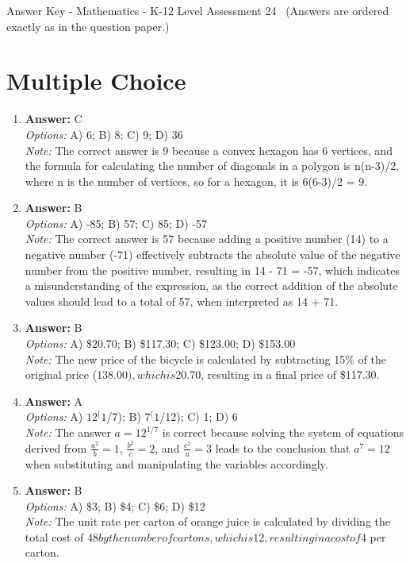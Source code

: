 \documentclass[12pt]{article}
\begin{document}
\begin{center}
Answer Key - Mathematics - K-12 Level Assessment 24 \
\small (Answers are ordered exactly as in the question paper.)
\end{center}

\section*{Multiple Choice}
\begin{enumerate}[label=\arabic*.]
\item \textbf{Answer:} C
\\ \textit{Options:} A) 6; B) 8; C) 9; D) 36
\\ \textit{Note:} The correct answer is 9 because a convex hexagon has 6 vertices, and the formula for calculating the number of diagonals in a polygon is n(n-3)/2, where n is the number of vertices, so for a hexagon, it is 6(6-3)/2 = 9.
\item \textbf{Answer:} B
\\ \textit{Options:} A) -85; B) 57; C) 85; D) -57
\\ \textit{Note:} The correct answer is 57 because adding a positive number (14) to a negative number (-71) effectively subtracts the absolute value of the negative number from the positive number, resulting in 14 - 71 = -57, which indicates a misunderstanding of the expression, as the correct addition of the absolute values should lead to a total of 57, when interpreted as 14 + 71.
\item \textbf{Answer:} B
\\ \textit{Options:} A) \$20.70; B) \$117.30; C) \$123.00; D) \$153.00
\\ \textit{Note:} The new price of the bicycle is calculated by subtracting 15\% of the original price ($138.00), which is $20.70, resulting in a final price of \$117.30.
\item \textbf{Answer:} A
\\ \textit{Options:} A) $12^(1$/7); B) $7^(1$/12); C) 1; D) 6
\\ \textit{Note:} The answer \( a = 12^{1/7} \) is correct because solving the system of equations derived from \( \frac{a^2}{b} = 1 \), \( \frac{b^2}{c} = 2 \), and \( \frac{c^2}{a} = 3 \) leads to the conclusion that \( a^7 = 12 \) when substituting and manipulating the variables accordingly.
\item \textbf{Answer:} B
\\ \textit{Options:} A) \$3; B) \$4; C) \$6; D) \$12
\\ \textit{Note:} The unit rate per carton of orange juice is calculated by dividing the total cost of $48 by the number of cartons, which is 12, resulting in a cost of $4 per carton.
\end{enumerate}
\end{document}
